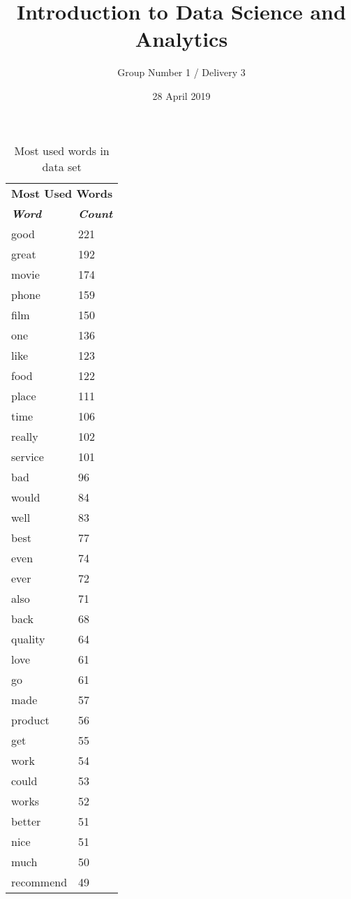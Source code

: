 \documentclass{article}
\title{Introduction to Data Science and Analytics}
\author{Group Number 1 / Delivery 3}
\date{28 April 2019}
\begin{document}
\begin{table}[htbp]
\caption{Most used words in data set}
\begin{center}
\begin{tabular}{|m{12em}|m{5em}|}
\hline
\multicolumn{2}{|c|}{\textbf{Most Used Words}} \\
\cline{1-2} 
\textbf{\textit{Word}}&
\textbf{\textit{Count}}\\
\hline
good & 221 \\
\hline
great & 192 \\
\hline
movie & 174 \\
\hline
phone & 159 \\
\hline
film & 150 \\
\hline
one & 136 \\
\hline
like & 123 \\
\hline
food & 122 \\
\hline
place & 111 \\
\hline
time & 106 \\
\hline
really & 102 \\
\hline
service & 101 \\
\hline
bad & 96 \\
\hline
would & 84 \\
\hline
well & 83 \\
\hline
best & 77 \\
\hline
even & 74 \\
\hline
ever & 72 \\
\hline
also & 71 \\
\hline
back & 68 \\
\hline
quality & 64 \\
\hline
love & 61 \\
\hline
go & 61 \\
\hline
made & 57 \\
\hline
product & 56 \\
\hline
get & 55 \\
\hline
work & 54 \\
\hline
could & 53 \\
\hline
works & 52 \\
\hline
better & 51 \\
\hline
nice & 51 \\
\hline
much & 50 \\
\hline
recommend & 49 \\

\end{tabular}
\end{center}
\end{table}
\end{document}
